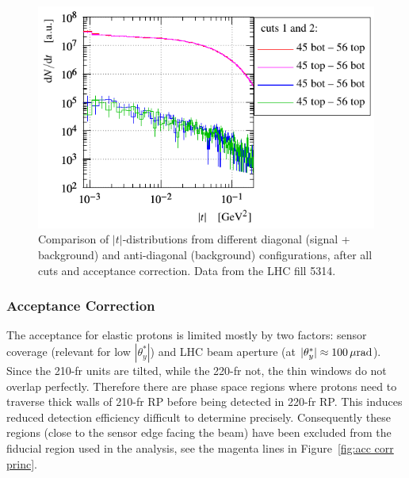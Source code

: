 \begin{figure}
\begin{center}
\includegraphics{fig/t_dist_antidgn_cmp.pdf}
\caption{%
Comparison of $|t|$-distributions from different diagonal (signal + background) and anti-diagonal (background) configurations, after all cuts and acceptance correction. Data from the LHC fill 5314.
}
\label{fig:tag bckg dist}
\end{center}
\end{figure}




\subsubsection{Acceptance Correction}
\label{sec:acc corr}

The acceptance for elastic protons is limited mostly by two factors: sensor coverage (relevant for low $|\theta^*_y|$) and LHC beam aperture (at $|\theta^*_y| \approx 100\,{\rm \mu rad}$). Since the 210-fr units are tilted, while the 220-fr not, the thin windows do not overlap perfectly. Therefore there are phase space regions where protons need to traverse thick walls of 210-fr RP before being detected in 220-fr RP. This induces reduced detection efficiency difficult to determine precisely. Consequently these regions (close to the sensor edge facing the beam) have been excluded from the fiducial region used in the analysis, see the magenta lines in Figure~\ref{fig:acc corr princ}.


